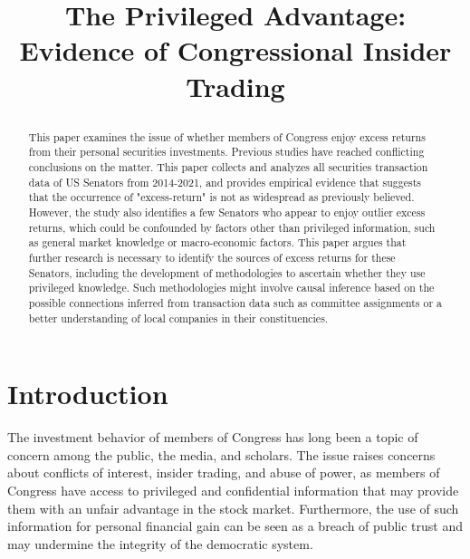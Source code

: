 \documentclass[12pt,letterpaper]{article}
\newcommand{\tit}{
\bf 
The Privileged Advantage: Evidence of Congressional Insider Trading
}
\newcommand\spacingset[1]{\renewcommand{\baselinestretch}
{#1}\small\normalsize}
\begin{document}
\spacingset{1.25}

\setcounter{page}{0}
\vspace{-.1in}

{\title{
    \tit
  }
  \author{
  }
  \maketitle
}

\thispagestyle{empty}
\vspace{-.1in}

\begin{abstract}
  This paper examines the issue of whether members of Congress enjoy excess returns from their personal securities investments. Previous studies have reached conflicting conclusions on the matter. This paper collects and analyzes all securities transaction data of US Senators from 2014-2021, and provides empirical evidence that suggests that the occurrence of "excess-return" is not as widespread as previously believed. However, the study also identifies a few Senators who appear to enjoy outlier excess returns, which could be confounded by factors other than privileged information, such as general market knowledge or macro-economic factors. This paper argues that further research is necessary to identify the sources of excess returns for these Senators, including the development of methodologies to ascertain whether they use privileged knowledge. Such methodologies might involve causal inference based on the possible connections inferred from transaction data such as committee assignments or a better understanding of local companies in their constituencies.
\end{abstract}

\spacingset{1.5} %

\clearpage

\section{Introduction}
The investment behavior of members of Congress has long been a topic of concern among the public, the media, and scholars. The issue raises concerns about conflicts of interest, insider trading, and abuse of power, as members of Congress have access to privileged and confidential information that may provide them with an unfair advantage in the stock market. Furthermore, the use of such information for personal financial gain can be seen as a breach of public trust and may undermine the integrity of the democratic system.
\end{document}
